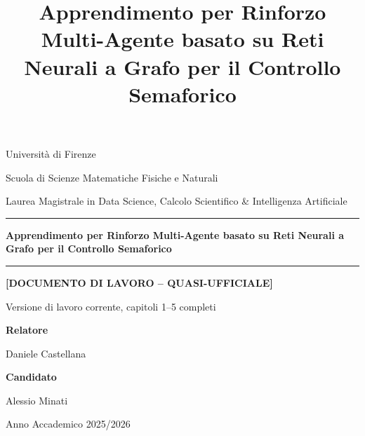 \documentclass[12pt,a4paper]{report}
\title{Apprendimento per Rinforzo Multi-Agente basato su Reti Neurali a Grafo per il Controllo Semaforico}
\author{}
\date{}
\newcommand{\nomeUniversita}{Università di Firenze}
\newcommand{\nomeDipartimento}{Scuola di Scienze Matematiche Fisiche e Naturali}
\newcommand{\nomeCorso}{Laurea Magistrale in Data Science, Calcolo Scientifico \& Intelligenza Artificiale}
\newcommand{\nomeRelatore}{Daniele Castellana}
\newcommand{\nomeCandidato}{Alessio Minati}
\newcommand{\annoAccademico}{2025/2026}
\begin{document}
\begin{titlepage}
  \centering
  \vspace*{0.5cm}
  {\large \nomeUniversita \par}
  \vspace{0.15cm}
  {\large \nomeDipartimento \par}
  \vspace{0.15cm}
  {\large \nomeCorso \par}

  \vspace{2.2cm}
  \rule{\textwidth}{0.6pt}\par
  \vspace{0.5cm}
  {\Huge \bfseries Apprendimento per Rinforzo Multi-Agente basato su Reti Neurali a Grafo per il Controllo Semaforico \par}
  \vspace{0.5cm}
  \rule{\textwidth}{0.6pt}\par

  \vspace{1cm}
  {\Large \bfseries [DOCUMENTO DI LAVORO -- QUASI-UFFICIALE] \par}
  {\normalsize Versione di lavoro corrente, capitoli 1--5 completi \par}

  \vspace{1.5cm}
  \begin{minipage}[t]{0.47\textwidth}
    \raggedright
    \large\textbf{Relatore}\par
    \normalsize\nomeRelatore\par
  \end{minipage}
  \hfill
  \begin{minipage}[t]{0.47\textwidth}
    \raggedleft
    \large\textbf{Candidato}\par
    \normalsize\nomeCandidato\par
  \end{minipage}

  \vfill
  {\large Anno Accademico \annoAccademico \par}
  \vspace{0.5cm}
\end{titlepage}

\newpage
\thispagestyle{empty}
\null
\newpage




\tableofcontents
\listoffigures
\listoftables



\cleardoublepage
{}









\end{document}
